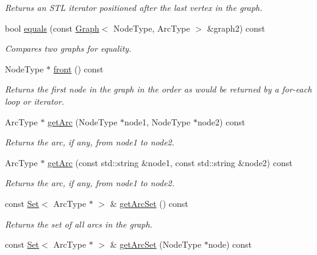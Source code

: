 \begin{DoxyCompactItemize}
\begin{DoxyCompactList}\small\item\em Returns an S\+TL iterator positioned after the last vertex in the graph. \end{DoxyCompactList}\item 
bool \mbox{\hyperlink{classGraph_a6bec43eb3dfdf3d23eb328b406edf44a}{equals}} (const \mbox{\hyperlink{classGraph}{Graph}}$<$ Node\+Type, Arc\+Type $>$ \&graph2) const
\begin{DoxyCompactList}\small\item\em Compares two graphs for equality. \end{DoxyCompactList}\item 
Node\+Type $\ast$ \mbox{\hyperlink{classGraph_a7b7c2c1738f8e7faf84c54d7642992fa}{front}} () const
\begin{DoxyCompactList}\small\item\em Returns the first node in the graph in the order as would be returned by a for-\/each loop or iterator. \end{DoxyCompactList}\item 
Arc\+Type $\ast$ \mbox{\hyperlink{classGraph_a7c33db338f839ff9e3dafe4fe61c16fd}{get\+Arc}} (Node\+Type $\ast$node1, Node\+Type $\ast$node2) const
\begin{DoxyCompactList}\small\item\em Returns the arc, if any, from node1 to node2. \end{DoxyCompactList}\item 
Arc\+Type $\ast$ \mbox{\hyperlink{classGraph_a94d4badfc856b0d4530c37121efb9834}{get\+Arc}} (const std\+::string \&node1, const std\+::string \&node2) const
\begin{DoxyCompactList}\small\item\em Returns the arc, if any, from node1 to node2. \end{DoxyCompactList}\item 
const \mbox{\hyperlink{classstanfordcpplib_1_1collections_1_1GenericSet}{Set}}$<$ Arc\+Type $\ast$ $>$ \& \mbox{\hyperlink{classGraph_a0690edaeae8d5256189ae2e8541788b5}{get\+Arc\+Set}} () const
\begin{DoxyCompactList}\small\item\em Returns the set of all arcs in the graph. \end{DoxyCompactList}\item 
const \mbox{\hyperlink{classstanfordcpplib_1_1collections_1_1GenericSet}{Set}}$<$ Arc\+Type $\ast$ $>$ \& \mbox{\hyperlink{classGraph_a17cfc7f4d8c738fc6f51813f50be6400}{get\+Arc\+Set}} (Node\+Type $\ast$node) const

\end{DoxyCompactItemize}
